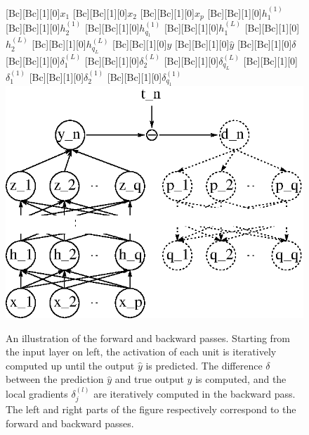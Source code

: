 \documentclass[dissertation,nocontribution]{aaltoseries}
\begin{document}
\begin{figure}[t]
    \centering
    [Bc][Bc][1][0]{$x_1$}
    [Bc][Bc][1][0]{$x_2$}
    [Bc][Bc][1][0]{$x_p$}
    [Bc][Bc][1][0]{$h^{(1)}_1$}
    [Bc][Bc][1][0]{$h^{(1)}_2$}
    [Bc][Bc][1][0]{$h^{(1)}_{q_1}$}
    [Bc][Bc][1][0]{$h^{(L)}_1$}
    [Bc][Bc][1][0]{$h^{(L)}_2$}
    [Bc][Bc][1][0]{$h^{(L)}_{q_L}$}
    [Bc][Bc][1][0]{$y$}
    [Bc][Bc][1][0]{$\hat{y}$}
    [Bc][Bc][1][0]{$\delta$}
    [Bc][Bc][1][0]{$\delta^{(L)}_1$}
    [Bc][Bc][1][0]{$\delta^{(L)}_2$}
    [Bc][Bc][1][0]{$\delta^{(L)}_{q_L}$}
    [Bc][Bc][1][0]{$\delta^{(1)}_1$}
    [Bc][Bc][1][0]{$\delta^{(1)}_2$}
    [Bc][Bc][1][0]{$\delta^{(1)}_{q_1}$}
    \includegraphics[width=0.75\columnwidth]{figures/mlp_bp.eps}
    \caption{An illustration of the forward and
    backward passes. Starting from the input layer on left,
    the activation of each unit is iteratively computed up
    until the output $\hat{y}$ is predicted. The difference
    $\delta$ between the prediction $\hat{y}$ and true
    output $y$ is computed, and the local gradients
    $\delta_j^{(l)}$ are iteratively computed in the
    backward pass. The left and right parts of the figure
    respectively correspond to the forward and backward
    passes.}
    \label{fig:backprop}
\end{figure}

\end{document}

